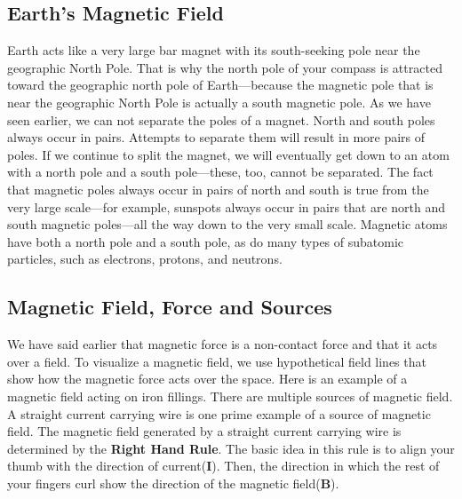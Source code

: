 \documentclass[9pt,addpoints]{exam}
\begin{document}
	\subsection*{Earth's Magnetic Field}
	Earth acts like a very large bar magnet with its south-seeking pole near the geographic North Pole. That is why the north pole of your compass is attracted toward the geographic north pole of Earth—because the magnetic pole that is near the geographic North Pole is actually a south magnetic pole. \newline
	As we have seen earlier, we can not separate the poles of a magnet. North and south poles always occur in pairs. Attempts to separate them will result in more pairs of poles. If we continue to split the	magnet, we will eventually get down to an atom with a north pole and a south pole—these, too, cannot be separated. The fact that magnetic poles always occur in pairs of north and south is true from the very large scale—for example, sunspots	always occur in pairs that are north and south magnetic poles—all the way down to the very small scale. Magnetic atoms have both a north pole and a south pole, as do many types of subatomic particles, such as electrons, protons, and neutrons.
	\newline 
	\subsection*{Magnetic Field, Force and Sources}
	We have said earlier that magnetic force is a non-contact force and that it acts over a field. To visualize a magnetic field, we use hypothetical field lines that show how the magnetic force acts over the space. Here is an example of a magnetic field acting on iron fillings.\newline
	There are multiple sources of magnetic field. A straight current carrying wire is one prime example of a source of magnetic field. The magnetic field generated by a straight current carrying wire is determined by the \textbf{Right Hand Rule}. The basic idea in this rule is to align your thumb with the direction of current(\textbf{I}). Then, the direction in which the rest of your fingers curl show the direction of the magnetic field(\textbf{B}).
	
	
\end{document}
